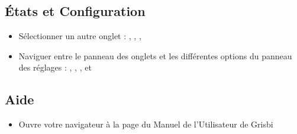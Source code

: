 \subsection{États et Configuration}

\begin{itemize}
	\item Sélectionner un autre onglet : , , , 
	\item Naviguer entre le panneau des onglets et les différentes options du panneau des réglages : , , ,  et 
\end{itemize}

\subsection{Aide}

\begin{itemize}
	\item Ouvre votre navigateur à la page du Manuel de l'Utilisateur de Grisbi 
\end{itemize}














